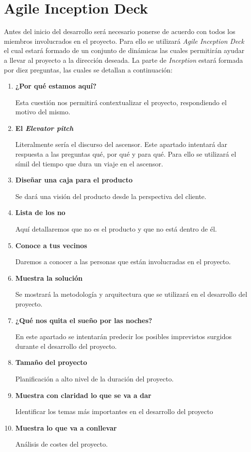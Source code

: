 \section{Agile Inception Deck}

Antes del inicio del desarrollo será necesario ponerse de acuerdo con todos los miembros involucrados en el proyecto.
Para ello se utilizará \textit{Agile Inception Deck} \cite{agileInceptionDeck} el cual estará formado de un conjunto de dinámicas las cuales permitirán
ayudar a llevar al proyecto a la dirección deseada. La parte de \textit{Inception} estará formada por diez preguntas, las
cuales se detallan a continuación:

\begin{enumerate}
  \item \textbf{¿Por qué estamos aquí?}

    Esta cuestión nos permitirá contextualizar el proyecto, respondiendo el motivo del mismo.
  \item \textbf{El \textit{Elevator pitch}}

    Literalmente sería el discurso del ascensor. Este apartado intentará dar respuesta a las preguntas qué, por qué y para qué.
    Para ello se utilizará el símil del tiempo que dura un viaje en el ascensor.
  \item \textbf{Diseñar una caja para el producto}

    Se dará una visión del producto desde la perspectiva del cliente.
  \item \textbf{Lista de los no}

    Aquí detallaremos que no es el producto y que no está dentro de él.
  \item \textbf{Conoce a tus vecinos}

    Daremos a conocer a las personas que están involucradas en el proyecto.
  \item \textbf{Muestra la solución}

    Se mostrará la metodología y arquitectura que se utilizará en el desarrollo del proyecto.
  \item \textbf{¿Qué nos quita el sueño por las noches?}

    En este apartado se intentarán predecir los posibles imprevistos surgidos durante
    el desarrollo del proyecto.
  \item \textbf{Tamaño del proyecto}

    Planificación a alto nivel de la duración del proyecto.
  \item \textbf{Muestra con claridad lo que se va a dar}

    Identificar los temas más importantes en el desarrollo del proyecto
  \item \textbf{Muestra lo que va a conllevar}

    Análisis de costes del proyecto.
\end{enumerate}
